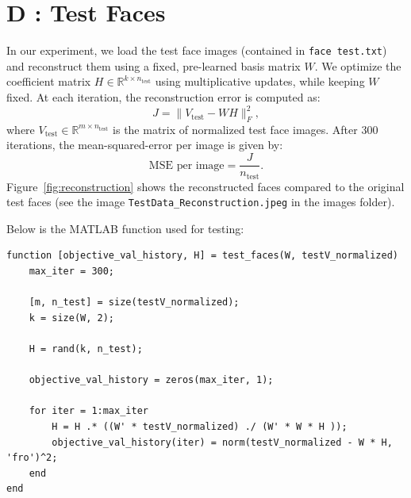 \documentclass[journal,12pt,onecolumn,draftclsnofoot]{IEEEtran}
\begin{document}
\section*{D : Test Faces}



In our experiment, we load the test face images (contained in \texttt{face test.txt}) and reconstruct them using a fixed, pre-learned basis matrix $W$. We optimize the coefficient matrix $H \in \mathbb{R}^{k \times n_{\text{test}}}$ using multiplicative updates, while keeping $W$ fixed. At each iteration, the reconstruction error is computed as:
\begin{equation}
    J = \|V_{\text{test}} - W H\|_F^2,
\end{equation}
where $V_{\text{test}} \in \mathbb{R}^{m \times n_{\text{test}}}$ is the matrix of normalized test face images. After 300 iterations, the mean-squared-error per image is given by:
\begin{equation}
    \text{MSE per image} = \frac{J}{n_{\text{test}}}.
\end{equation}
Figure~\ref{fig:reconstruction} shows the reconstructed faces compared to the original test faces (see the image \texttt{TestData\_Reconstruction.jpeg} in the images folder).

Below is the MATLAB function used for testing:

\begin{lstlisting}
function [objective_val_history, H] = test_faces(W, testV_normalized)
    max_iter = 300;
    
    [m, n_test] = size(testV_normalized);
    k = size(W, 2);
    
    H = rand(k, n_test);
    
    objective_val_history = zeros(max_iter, 1);
    
    for iter = 1:max_iter
        H = H .* ((W' * testV_normalized) ./ (W' * W * H ));
        objective_val_history(iter) = norm(testV_normalized - W * H, 'fro')^2;
    end
end
\end{lstlisting}
\end{document}

